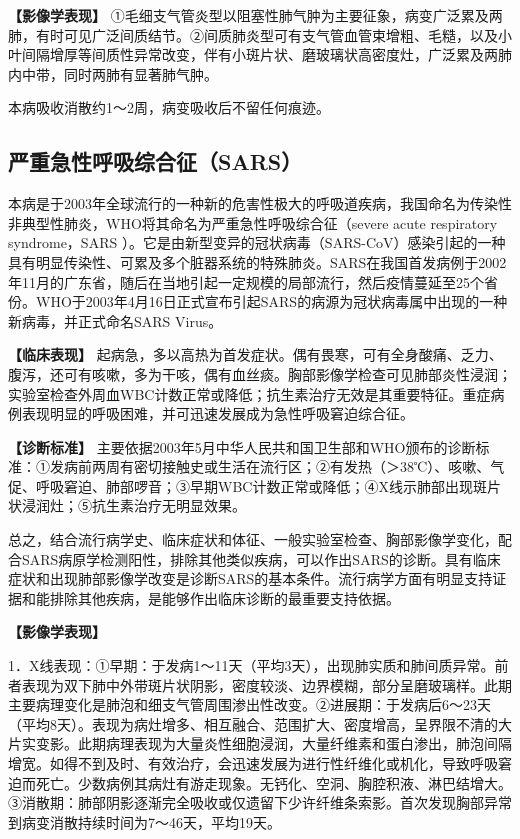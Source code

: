 \textbf{【影像学表现】}
①毛细支气管炎型以阻塞性肺气肿为主要征象，病变广泛累及两肺，有时可见广泛间质结节。②间质肺炎型可有支气管血管束增粗、毛糙，以及小叶间隔增厚等间质性异常改变，伴有小斑片状、磨玻璃状高密度灶，广泛累及两肺内中带，同时两肺有显著肺气肿。

本病吸收消散约1～2周，病变吸收后不留任何痕迹。

\subsection{严重急性呼吸综合征（SARS）}

本病是于2003年全球流行的一种新的危害性极大的呼吸道疾病，我国命名为传染性非典型性肺炎，WHO将其命名为严重急性呼吸综合征（severe
acute respiratory syndrome，SARS
）。它是由新型变异的冠状病毒（SARS-CoV）感染引起的一种具有明显传染性、可累及多个脏器系统的特殊肺炎。SARS在我国首发病例于2002年11月的广东省，随后在当地引起一定规模的局部流行，然后疫情蔓延至25个省份。WHO于2003年4月16日正式宣布引起SARS的病源为冠状病毒属中出现的一种新病毒，并正式命名SARS
Virus。

\textbf{【临床表现】}
起病急，多以高热为首发症状。偶有畏寒，可有全身酸痛、乏力、腹泻，还可有咳嗽，多为干咳，偶有血丝痰。胸部影像学检查可见肺部炎性浸润；实验室检查外周血WBC计数正常或降低；抗生素治疗无效是其重要特征。重症病例表现明显的呼吸困难，并可迅速发展成为急性呼吸窘迫综合征。

\textbf{【诊断标准】}
主要依据2003年5月中华人民共和国卫生部和WHO颁布的诊断标准：①发病前两周有密切接触史或生活在流行区；②有发热（＞38℃）、咳嗽、气促、呼吸窘迫、肺部啰音；③早期WBC计数正常或降低；④X线示肺部出现斑片状浸润灶；⑤抗生素治疗无明显效果。

总之，结合流行病学史、临床症状和体征、一般实验室检查、胸部影像学变化，配合SARS病原学检测阳性，排除其他类似疾病，可以作出SARS的诊断。具有临床症状和出现肺部影像学改变是诊断SARS的基本条件。流行病学方面有明显支持证据和能排除其他疾病，是能够作出临床诊断的最重要支持依据。

\textbf{【影像学表现】}

1．X线表现：①早期：于发病1～11天（平均3天），出现肺实质和肺间质异常。前者表现为双下肺中外带斑片状阴影，密度较淡、边界模糊，部分呈磨玻璃样。此期主要病理变化是肺泡和细支气管周围渗出性改变。②进展期：于发病后6～23天（平均8天）。表现为病灶增多、相互融合、范围扩大、密度增高，呈界限不清的大片实变影。此期病理表现为大量炎性细胞浸润，大量纤维素和蛋白渗出，肺泡间隔增宽。如得不到及时、有效治疗，会迅速发展为进行性纤维化或机化，导致呼吸窘迫而死亡。少数病例其病灶有游走现象。无钙化、空洞、胸腔积液、淋巴结增大。③消散期：肺部阴影逐渐完全吸收或仅遗留下少许纤维条索影。首次发现胸部异常到病变消散持续时间为7～46天，平均19天。

